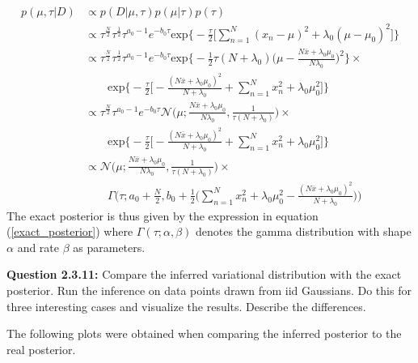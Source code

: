\begin{align}
  p(\mu,\tau|D) & \propto  p(D|\mu, \tau)p(\mu|\tau) p(\tau) \nonumber \\
  & \propto \tau^{\frac{N}{2}}\tau^{\frac{1}{2}}\tau^{a_0 - 1} e^{-b_0\tau} \text{exp} \Bigg\{ -\frac{\tau}{2}\Bigg[ \sum_{n=1}^N (x_n - \mu)^2 + \lambda_0 (\mu - \mu_0)^2 \Bigg] \Bigg \} \nonumber \\
  & \propto \tau^{\frac{N}{2}}\tau^{\frac{1}{2}}\tau^{a_0 - 1} e^{-b_0\tau} \text{exp}
   \Bigg\{ -\frac{1}{2}\tau (N + \lambda_0) \bigg( \mu -  \frac{N \overline{x} + \lambda_0 \mu_0}{N \lambda_0} \bigg)^2 \Bigg \} \times \nonumber \\
  & \qquad \text{exp} \Bigg\{ -\frac{\tau}{2}\Bigg[- \frac{(N\overline{x} + \lambda_0\mu_0)^2}{N+\lambda_0} + \sum_{n=1}^N x_n^2 + \lambda_0\mu_0^2 \Bigg] \Bigg \} \nonumber \\
  & \propto \tau^{\frac{N}{2}}\tau^{a_0 - 1} e^{-b_0\tau} \mathcal{N} \bigg( \mu; \frac{N \overline{x} + \lambda_0 \mu_0}{N \lambda_0}, \frac{1}{\tau (N + \lambda_0)} \bigg) \times \nonumber \\
  & \qquad \text{exp} \Bigg\{ -\frac{\tau}{2}\Bigg[- \frac{(N\overline{x} + \lambda_0\mu_0)^2}{N+\lambda_0} + \sum_{n=1}^N x_n^2 + \lambda_0\mu_0^2 \Bigg] \Bigg\} \nonumber \\
  & \propto \mathcal{N} \bigg( \mu; \frac{N \overline{x} + \lambda_0 \mu_0}{N \lambda_0}, \frac{1}{\tau (N + \lambda_0)} \bigg) \times \nonumber \\
  & \qquad \Gamma \bigg(\tau; a_0 + \frac{N}{2},
  b_0 + \frac{1}{2}\big (\sum_{n=1}^N x_n^2 + \lambda_0 \mu_0^2 - \frac{(N\overline{x} + \lambda_0\mu_0)^2}{N+\lambda_0}\big ) \bigg)
  \label{exact_posterior}
\end{align}
The exact posterior is thus given by the expression in equation (\ref{exact_posterior}) where $\Gamma(\tau; \alpha, \beta)$ denotes the gamma distribution with shape $\alpha$ and rate $\beta$ as parameters.
\\

\begin{tcolorbox}
\textbf{Question 2.3.11:}
Compare the inferred variational distribution with the exact posterior. Run the inference on data points drawn from iid Gaussians. Do this for three interesting cases and visualize the results. Describe the differences.
\end{tcolorbox}
The following plots were obtained when comparing the inferred posterior to the real posterior.


